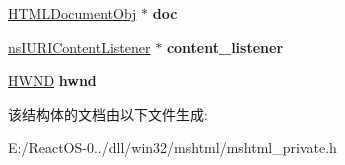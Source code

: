 \begin{DoxyCompactItemize}
\hyperlink{struct_h_t_m_l_document_obj}{H\+T\+M\+L\+Document\+Obj} $\ast$ {\bfseries doc}
\item 
\mbox{\label{struct_n_s_container_a85aee27cff202f44ec28ca99531d9047}} 
\hyperlink{interfacens_i_u_r_i_content_listener}{ns\+I\+U\+R\+I\+Content\+Listener} $\ast$ {\bfseries content\+\_\+listener}
\item 
\mbox{\label{struct_n_s_container_ac05497c51ce970a824bc7442d2bc776d}} 
\hyperlink{interfacevoid}{H\+W\+ND} {\bfseries hwnd}
\end{DoxyCompactItemize}


该结构体的文档由以下文件生成\+:\begin{DoxyCompactItemize}
\item 
E\+:/\+React\+O\+S-\/0../dll/win32/mshtml/mshtml\+\_\+private.\+h\end{DoxyCompactItemize}
